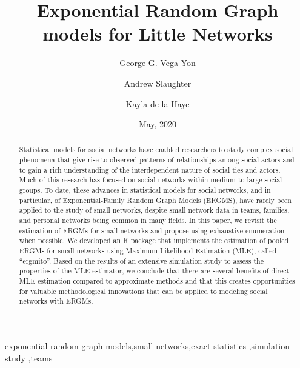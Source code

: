 \documentclass[review, nonatbib,doubleblind]{elsarticle/elsarticle}
\author[1]{George G. Vega Yon\corref{cor1}}
\author[2]{Andrew Slaughter}
\author[1]{Kayla de la Haye}
\title{Exponential Random Graph models for Little Networks\tnoteref{t1}}%
\date{May, 2020}
\begin{document}
\begin{abstract}
    Statistical models for social networks have enabled researchers to study complex social phenomena that give rise to observed patterns of relationships among social actors and to gain a rich understanding of the interdependent nature of social ties and actors. Much of this research has focused on social networks within medium to large social groups. To date, these advances in statistical models for social networks, and in particular, of Exponential-Family Random Graph Models (ERGMS), have rarely been applied to the study of small networks, despite small network data in teams, families, and personal networks being common in many fields. In this paper, we revisit the estimation of ERGMs for small networks and propose using exhaustive enumeration when possible. We developed an R package that implements the estimation of pooled ERGMs for small networks using Maximum Likelihood Estimation (MLE), called ``ergmito''. Based on the results of an extensive simulation study to assess the properties of the MLE estimator, we conclude that there are several benefits of direct MLE estimation compared to approximate methods and that this creates opportunities for valuable methodological innovations that can be applied to modeling social networks with ERGMs.
\end{abstract}

\begin{keyword}
exponential random graph models\sep small networks\sep exact statistics \sep simulation study \sep teams
\end{keyword}

\maketitle

% 
% 
\end{document}
